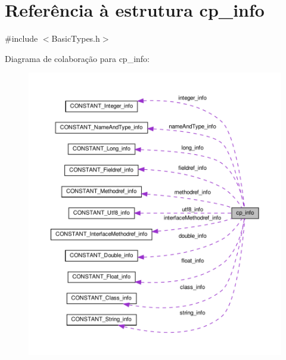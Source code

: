 \hypertarget{structcp__info}{}\section{Referência à estrutura cp\+\_\+info}
\label{structcp__info}


{\ttfamily \#include $<$Basic\+Types.\+h$>$}



Diagrama de colaboração para cp\+\_\+info\+:\nopagebreak
\begin{figure}[H]
\begin{center}
\leavevmode
\includegraphics[width=350pt]{structcp__info__coll__graph}
\end{center}
\end{figure}
